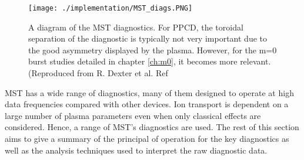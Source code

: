 \begin{figure}[!htb]
	\centering
	\texttt{[image: ./implementation/MST\_diags.PNG]}
	\label{fig:MST_diagnostic_diagram}
	\caption[Diagram of diagnostic locations]{A diagram of the MST diagnostics. For PPCD, the toroidal separation of the diagnostic is typically not very important due to the good asymmetry displayed by the plasma. However, for the m=0 burst studies detailed in chapter \ref{ch:m0}, it becomes more relevant. (Reproduced from R. Dexter et al. Ref\cite{Dexter100}}
\end{figure}

MST has a wide range of diagnostics, many of them designed to operate at high data frequencies compared with %
other devices. Ion transport is dependent on a large number of plasma parameters even when only classical effects are considered. Hence, a range of MST's diagnostics are used. The rest of this section aims to give a summary of the principal of operation for the key diagnostics as well as the analysis techniques used to interpret %
the raw diagnostic data. 









